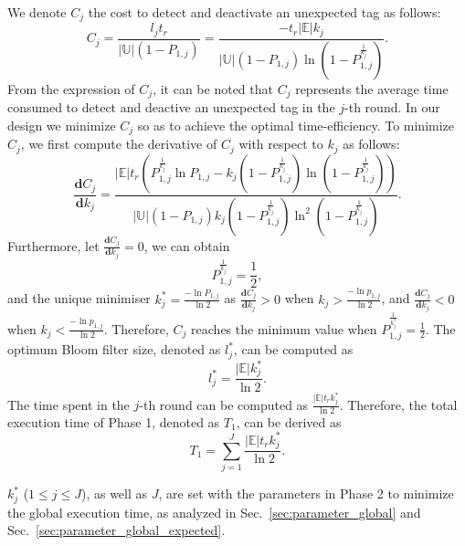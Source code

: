 \documentclass[10pt, twocolumn]{IEEEtran}
\begin{document}
We denote $C_j$ the cost to detect and deactivate an unexpected tag as follows:
\begin{equation}
C_j = \frac{l_j t_r}{|\mathbb{U}|(1-P_{1,j})}
= \frac{-t_r |\mathbb{E}| k_j}{|\mathbb{U}|(1-P_{1,j}) \ln (1- P^{\frac{1}{k_j}}_{1,j})}.
\end{equation}
From the expression of $C_j$, it can be noted that $C_j$ represents the average time consumed to detect and deactive an unexpected tag in the $j$-th round. In our design we minimize $C_j$ so as to achieve the optimal time-efficiency. To minimize $C_j$, we first compute the derivative of $C_j$ with respect to $k_j$ as follows:
\begin{equation}
\frac{\mathbf{d} C_j}{\mathbf{d}k_j}
= \frac{|\mathbb{E}| t_r \left(P^{\frac{1}{k_j}}_{1,j} \ln P_{1,j}
  - k_j (1-P^{\frac{1}{k_j}}_{1,j}) \ln(1-P^{\frac{1}{k_j}}_{1,j})\right)} {|\mathbb{U}|(1-P_{1,j}) k_j (1-P^{\frac{1}{k_j}}_{1,j}) \ln^2(1-P^{\frac{1}{k_j}}_{1,j})}.
\end{equation}
Furthermore, let $\frac{\mathbf{d} C_j}{\mathbf{d}k_j}=0$, we can obtain
\begin{equation}
P^{\frac{1}{k_j}}_{1,j}=\frac{1}{2},
\label{Eq:p_k}
\end{equation}
and the unique minimiser $k_j^* = \frac{-\ln P_{1,j}}{\ln 2}$ as $\frac{\mathbf{d} C_j}{\mathbf{d}k_j}>0$ when $k_j > \frac{-\ln p_{1,j}}{\ln 2}$, and $\frac{\mathbf{d} C_j}{\mathbf{d}k_j}<0$ when $k_j < \frac{-\ln p_{1,j}}{\ln 2}$. Therefore, $C_j$ reaches the minimum value when $P^{\frac{1}{k_j^*}}_{1,j}=\frac{1}{2}$. The optimum Bloom filter size, denoted as $l^*_j$, can be computed as
\begin{equation}
l^*_j = \frac{|\mathbb{E}| k_j^*}{\ln 2}.
\label{Eq:l_j}
\end{equation}
The time spent in the $j$-th round can be computed as
$\frac{|\mathbb{E}| t_r k_j^*}{\ln 2}$.
Therefore, the total execution time of Phase 1, denoted as $T_1$, can be derived as
\begin{equation}
T_1 = \sum_{j=1}^{J} \frac{|\mathbb{E}| t_r k_j^*}{\ln 2}.
\label{Eq:T1}
\end{equation}

$k_j^*$ ($1\le j\le J$), as well as $J$, are set with the parameters in Phase 2 to minimize the global execution time, as analyzed in Sec.~\ref{sec:parameter_global} and Sec.~\ref{sec:parameter_global_expected}.

\begin{comment}
It is easy to check that the minimum value ${P_{1,j}}_{min}$ of $P_{1,j}$ equals to $\phi^{l_j /|\mathbb{E}|}$ when the number of hash function $k_j=\frac{l_j}{|\mathbb{E}|} \ln2$, where $\phi = (\frac{1}{2})^{\ln 2}=0.6185$. Since $k_j \ge 1$, $l_j \ge \frac{|\mathbb{E}|}{\ln 2}$.
\end{comment}
\end{document}
